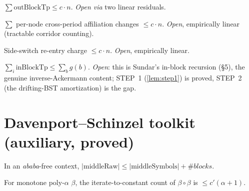 \begin{lemma}\label{lem:outchannel}
  $\sum \mathrm{outBlockTp} \le c\cdot n$. \emph{Open via} two linear residuals.
\end{lemma}

\begin{lemma}\label{lem:reaff}
  $\sum$ per-node cross-period affiliation changes $\le c\cdot n$. \emph{Open},
  empirically linear (tractable corridor counting).
\end{lemma}

\begin{lemma}\label{lem:reentry}
  Side-switch re-entry charge $\le c\cdot n$. \emph{Open}, empirically linear.
\end{lemma}

\begin{theorem}\label{thm:inblock}
  $\sum_i \mathrm{inBlockTp} \le \sum_b g(b)$. \emph{Open}: this is Sundar's
  in-block recursion (\S5), the genuine inverse-Ackermann content; STEP~1
  (\ref{lem:step1}) is proved, STEP~2 (the drifting-BST amortization) is the gap.
\end{theorem}

\section{Davenport--Schinzel toolkit (auxiliary, proved)}

\begin{lemma}\label{lem:middles}\leanok
  In an \emph{ababa}-free context, $|\mathrm{middleRaw}| \le |\mathrm{middleSymbols}| + \#blocks$.
\end{lemma}

\begin{lemma}\label{lem:gamma}\leanok{}
  For monotone poly-$\alpha$ $\beta$, the iterate-to-constant count of
  $\beta\circ\beta$ is $\le c'(\alpha+1)$.
\end{lemma}
